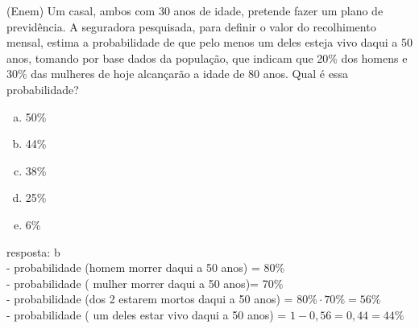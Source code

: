 \begin{ex}
  (Enem) Um casal, ambos com 30 anos de idade, pretende fazer um plano de previdência. A seguradora pesquisada, para definir o valor do recolhimento mensal, estima a probabilidade de que pelo menos um deles esteja vivo daqui a 50 anos, tomando por base dados da população, que indicam que 20\% dos homens e 30\% das mulheres de hoje alcançarão a idade de 80 anos. Qual é essa probabilidade?
     \begin{enumerate}  [(a)]
         \item 50\%
         \item 44\%
         \item 38\%
         \item 25\%
         \item 6\%
     \end{enumerate}
       \begin{sol}
        resposta: b \\
        - probabilidade (homem morrer daqui a 50 anos) = 80\%  \\
        - probabilidade ( mulher morrer daqui a 50 anos)= 70\% \\
        - probabilidade (dos 2 estarem mortos daqui a 50 anos) = $80\%\cdot70\%=56\%$ \\
        - probabilidade ( um deles estar vivo daqui a 50 anos) = $1-0,56=0,44=44\%$
       \end{sol}
  \end{ex}
